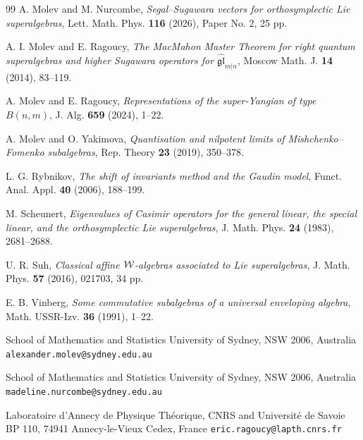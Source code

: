 \documentclass[12pt]{article}
\begin{document}
\begin{thebibliography}{99}
A. Molev and M. Nurcombe,
{\it Segal--Sugawara vectors for orthosymplectic Lie superalgebras},
Lett. Math. Phys. {\bf 116} (2026), Paper No. 2, 25 pp.

A. I. Molev and E. Ragoucy,
{\it The MacMahon Master Theorem for right quantum superalgebras and higher Sugawara operators for $\widehat{\mathfrak{gl}}_{m|n}$},
Moscow Math. J. {\bf 14} (2014), 83--119.

{A. Molev and E. Ragoucy},
{\it Representations of the super-Yangian of type $B(n,m)$},
J. Alg. {\bf 659} (2024), 1--22.

A. Molev and O. Yakimova,
{\it Quantisation and nilpotent limits of Mishchenko--Fomenko subalgebras},
Rep. Theory {\bf 23} (2019), 350--378.

L. G. Rybnikov,
{\it The shift of invariants method and the Gaudin model},
Funct. Anal. Appl. {\bf 40} (2006), 188--199.

M. Scheunert,
{\it Eigenvalues of Casimir operators for the general linear, the
special linear, and the orthosymplectic Lie superalgebras},
J. Math. Phys. {\bf 24} (1983), 2681--2688.

U. R. Suh,
{\it Classical affine ${\mathcal W}$-algebras associated to Lie superalgebras},
J. Math. Phys. {\bf 57} (2016), 021703, 34 pp.

E. B. Vinberg,
{\it Some commutative subalgebras of a universal enveloping algebra},
Math. USSR-Izv. {\bf 36} (1991), 1--22.


\end{thebibliography}



\bigskip
\bigskip

\small
\noindent
School of Mathematics and Statistics\newline
University of Sydney,
NSW 2006, Australia\newline
{\tt alexander.molev@sydney.edu.au}

\vspace{5 mm}

\noindent
School of Mathematics and Statistics\newline
University of Sydney,
NSW 2006, Australia\newline
{\tt madeline.nurcombe@sydney.edu.au}

\vspace{5 mm}

\noindent
Laboratoire d'Annecy de Physique Th\'{e}orique,
CNRS and Universit\'{e} de Savoie\newline
BP 110, 74941 Annecy-le-Vieux Cedex, France\newline
{\tt eric.ragoucy@lapth.cnrs.fr}
\end{document}
